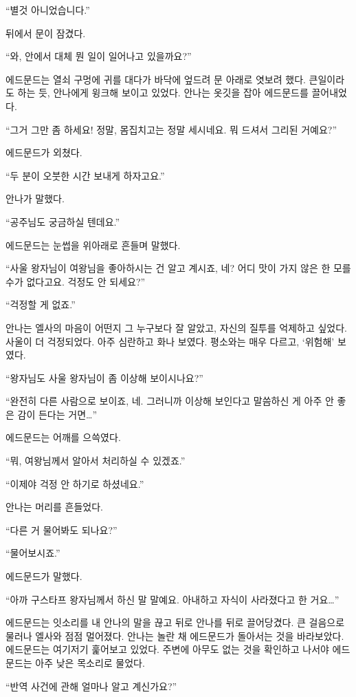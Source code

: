 ``별것 아니었습니다.''

뒤에서 문이 잠겼다.

\textbreak

\forceindent``와, 안에서 대체 뭔 일이 일어나고 있을까요?''

에드문드는 열쇠 구멍에 귀를 대다가 바닥에 엎드려 문 아래로 엿보려 했다. 큰일이라도 하는 듯, 안나에게 윙크해 보이고 있었다. 안나는 옷깃을 잡아 에드문드를 끌어내었다.

``그거 그만 좀 하세요! 정말, 몸집치고는 정말 세시네요. 뭐 드셔서 그리된 거예요?''

에드문드가 외쳤다.

``두 분이 오붓한 시간 보내게 하자고요.''

안나가 말했다.

``공주님도 궁금하실 텐데요.''

에드문드는 눈썹을 위아래로 흔들며 말했다.

``사울 왕자님이 여왕님을 좋아하시는 건 알고 계시죠, 네? 어디 맛이 가지 않은 한 모를 수가 없다고요. 걱정도 안 되세요?''

``걱정할 게 없죠.''

안나는 엘사의 마음이 어떤지 그 누구보다 잘 알았고, 자신의 질투를 억제하고 싶었다. 사울이 더 걱정되었다. 아주 심란하고 화나 보였다. 평소와는 매우 다르고, `위험해' 보였다.

``왕자님도 사울 왕자님이 좀 이상해 보이시나요?''

``완전히 다른 사람으로 보이죠, 네. 그러니까 이상해 보인다고 말씀하신 게 아주 안 좋은 감이 든다는 거면\ldots''

에드문드는 어깨를 으쓱였다.

``뭐, 여왕님께서 알아서 처리하실 수 있겠죠.''

``이제야 걱정 안 하기로 하셨네요.''

안나는 머리를 흔들었다.

``다른 거 물어봐도 되나요?''

``물어보시죠.''

에드문드가 말했다.

``아까 구스타프 왕자님께서 하신 말 말예요. 아내하고 자식이 사라졌다고 한 거요\ldots''

에드문드는 잇소리를 내 안나의 말을 끊고 뒤로 안나를 뒤로 끌어당겼다. 큰 걸음으로 물러나 엘사와 점점 멀어졌다. 안나는 놀란 채 에드문드가 돌아서는 것을 바라보았다. 에드문드는 여기저기 훑어보고 있었다. 주변에 아무도 없는 것을 확인하고 나서야 에드문드는 아주 낮은 목소리로 물었다.

``반역 사건에 관해 얼마나 알고 계신가요?''

